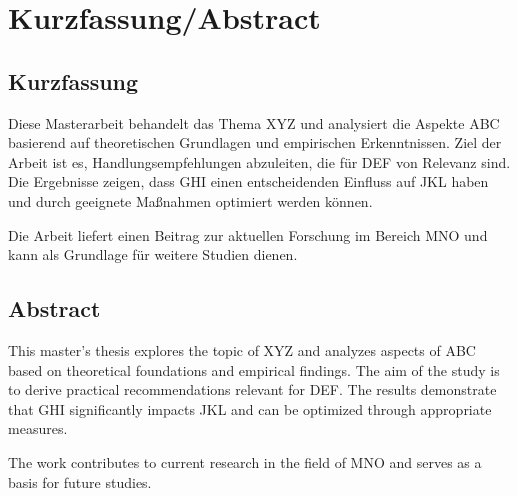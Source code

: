 \newpage
\chapter*{Kurzfassung/Abstract}

\section*{Kurzfassung}
Diese Masterarbeit behandelt das Thema XYZ und analysiert die Aspekte ABC basierend auf theoretischen Grundlagen und empirischen Erkenntnissen. Ziel der Arbeit ist es, Handlungsempfehlungen abzuleiten, die für DEF von Relevanz sind. Die Ergebnisse zeigen, dass GHI einen entscheidenden Einfluss auf JKL haben und durch geeignete Maßnahmen optimiert werden können.

Die Arbeit liefert einen Beitrag zur aktuellen Forschung im Bereich MNO und kann als Grundlage für weitere Studien dienen.


\section*{Abstract}
This master's thesis explores the topic of XYZ and analyzes aspects of ABC based on theoretical foundations and empirical findings. The aim of the study is to derive practical recommendations relevant for DEF. The results demonstrate that GHI significantly impacts JKL and can be optimized through appropriate measures.

The work contributes to current research in the field of MNO and serves as a basis for future studies.

